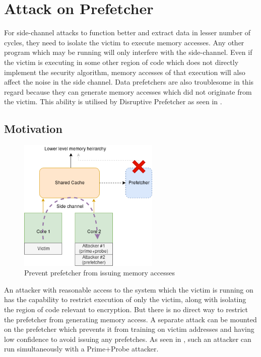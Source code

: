 \chapter{Attack on Prefetcher}

For side-channel attacks to function better and extract data in lesser number
of cycles, they need to isolate the victim to execute memory accesses.
Any other program which may be running will only interfere with the side-channel.
Even if the victim is executing in some other region of code which does not
directly implement the security algorithm, memory accesses of that execution
will also affect the noise in the side channel. Data prefetchers are
also troublesome in this regard because they can generate memory accesses which
did not originate from the victim. This ability is utilised by Disruptive Prefetcher
as seen in .

\section{Motivation}

\begin{figure}[ht]
    \centering
    \includegraphics[width=0.6\textwidth]{figures/prefetch_attack}
    \caption{Prevent prefetcher from issuing memory accesses}
    \label{fig:prefetch_attack}
\end{figure}

An attacker with reasonable access to the system which the victim is running on
has the capability to restrict execution of only the victim, along with
isolating the region of code relevant to encryption. But there is no
direct way to restrict the prefetcher from generating memory access.
A separate attack can be mounted on the prefetcher which prevents it
from training on victim addresses and having low confidence to
avoid issuing any prefetches. As seen in , such an
attacker can run simultaneously with a Prime+Probe attacker.

